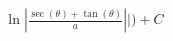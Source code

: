 \documentclass[preview]{standalone}
\begin{document}
\begin{align*}
\ln|\frac{\sec(\theta)+\tan(\theta)}{a}||)+C
\end{align*}
\end{document}
